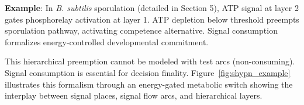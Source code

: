 \vspace{3pt}
\noindent\textbf{Example}: In \textit{B. subtilis} sporulation (detailed in Section 5), ATP signal at layer 2 gates phosphorelay activation at layer 1. ATP depletion below threshold preempts sporulation pathway, activating competence alternative. Signal consumption formalizes energy-controlled developmental commitment.

\vspace{3pt}
\noindent This hierarchical preemption cannot be modeled with test arcs (non-consuming). Signal consumption is essential for decision finality. Figure~\ref{fig:shypn_example} illustrates this formalism through an energy-gated metabolic switch showing the interplay between signal places, signal flow arcs, and hierarchical layers.
